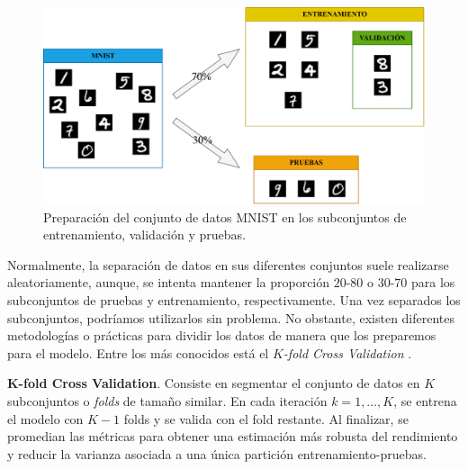 \begin{figure}[h]
	\centering
	\includegraphics[width=0.8\linewidth]{figures/ejemplos/preparacion_datos_mnist.png}
	\caption{Preparación del conjunto de datos MNIST en los subconjuntos de entrenamiento, validación y pruebas.}
	\label{fig:preparcion_datos_mnist}
\end{figure}

Normalmente, la separación de datos en sus diferentes conjuntos suele realizarse aleatoriamente, aunque, se intenta mantener la proporción $20$-$80$ o $30$-$70$ para los subconjuntos de pruebas y entrenamiento, respectivamente. Una vez separados los subconjuntos, podríamos utilizarlos sin problema. No obstante, existen diferentes metodologías o prácticas para dividir los datos de manera que los preparemos para el modelo. Entre los más conocidos está el \textit{$K$-fold Cross Validation} \cite{dl_python__chollet_2021, dl_fundamentos__casas_roma_2020}.

\textbf{K-fold Cross Validation}. Consiste en segmentar el conjunto de datos en $K$ subconjuntos o \textit{folds} de tamaño similar. En cada iteración \(k=1,\dots,K\), se entrena el modelo con \(K-1\) folds y se valida con el fold restante. Al finalizar, se promedian las métricas para obtener una estimación más robusta del rendimiento y reducir la varianza asociada a una única partición entrenamiento-pruebas.

